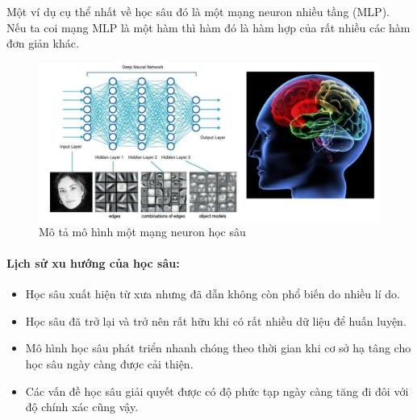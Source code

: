 \documentclass[a4paper,12pt]{report}
\begin{document}
Một ví dụ cụ thể nhất về học sâu đó là một mạng neuron nhiều tầng (MLP). Nếu ta coi mạng MLP là một hàm thì hàm đó là hàm hợp của rất nhiều các hàm đơn giản khác.
\begin{figure}[H]
\includegraphics[scale=0.45]{deeplearning.png}
\caption{Mô tả mô hình một mạng neuron học sâu}
\end{figure}

\paragraph{Lịch sử xu hướng của học sâu:}
\begin{itemize}
\item Học sâu xuất hiện từ xưa nhưng đã dẫn không còn phổ biến do nhiều lí do.
\item Học sâu đã trở lại  và trở nên rất hữu khi có rất nhiều dữ liệu để huấn luyện.
\item Mô hình học sâu phát triển nhanh chóng theo thời gian khi cơ sở hạ tâng cho học sâu ngày càng được cải thiện. 
\item Các vấn đề học sâu giải quyết được có độ phức tạp ngày càng tăng đi đôi với độ chính xác cũng vậy.
\end{itemize}
\end{document}
